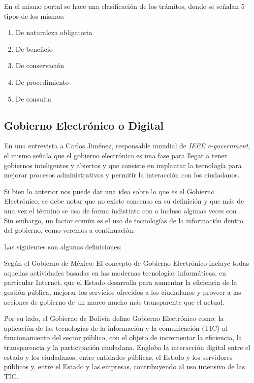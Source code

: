 En el mismo portal se hace una clasificación de los trámites, donde se señalan 5 tipos de los mismos:

\begin{enumerate}
    \item De naturaleza obligatoria
    \item De beneficio
    \item De conservación
    \item De procedimiento
    \item De consulta
\end{enumerate}

\subsection{Gobierno Electrónico o Digital}

En una entrevista a Carlos Jiménez, responsable mundial de \textit{IEEE e-government}, el mismo señala que el gobierno electrónico es una fase para llegar a tener gobiernos inteligentes y abiertos y que consiste en implantar la tecnología para mejorar procesos administrativos y permitir la interacción con los ciudadanos.

Si bien lo anterior nos puede dar una idea sobre lo que es el Gobierno Electrónico, se debe notar que no existe consenso en su definición y que más de una vez el término se usa de forma indistinta con  o incluso algunas veces con . Sin embargo, un factor común es el uso de tecnologías de la información dentro del gobierno, como veremos a continuación.

Las siguientes son algunas definiciones:

Según el Gobierno de México: El concepto de Gobierno Electrónico incluye todas aquellas actividades basadas en las modernas tecnologías informáticas, en particular Internet, que el Estado desarrolla para aumentar la eficiencia de la gestión pública, mejorar los servicios ofrecidos a los ciudadanos y proveer a las acciones de gobierno de un marco mucho más transparente que el actual.

Por su lado, el Gobierno de Bolivia define Gobierno Electrónico como: la aplicación de las tecnologías de la información y la comunicación (TIC) al funcionamiento del sector público, con el objeto de incrementar la eficiencia, la transparencia y la participación ciudadana.
Engloba la interacción digital entre el estado y los ciudadanos, entre entidades públicas, el Estado y los servidores públicos y, entre el Estado y las empresas, contribuyendo al uso intensivo de las TIC.

